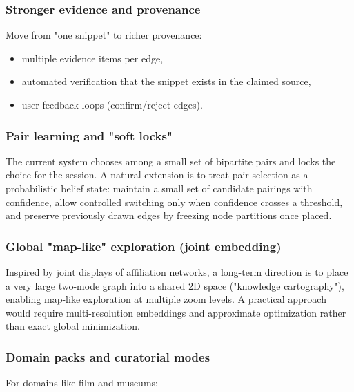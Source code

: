 \subsubsection{Stronger evidence and provenance}

Move from "one snippet" to richer provenance:

\begin{itemize}[leftmargin=*]

\item multiple evidence items per edge,

\item automated verification that the snippet exists in the claimed source,

\item user feedback loops (confirm/reject edges).

\end{itemize}

\subsubsection{Pair learning and "soft locks"}

The current system chooses among a small set of bipartite pairs and locks the choice for the session. A natural extension is to treat pair selection as a probabilistic belief state: maintain a small set of candidate pairings with confidence, allow controlled switching only when confidence crosses a threshold, and preserve previously drawn edges by freezing node partitions once placed.

\subsubsection{Global "map-like" exploration (joint embedding)}

Inspired by joint displays of affiliation networks, a long-term direction is to place a very large two-mode graph into a shared 2D space ("knowledge cartography"), enabling map-like exploration at multiple zoom levels. A practical approach would require multi-resolution embeddings and approximate optimization rather than exact global minimization.

\subsubsection{Domain packs and curatorial modes}

For domains like film and museums:

